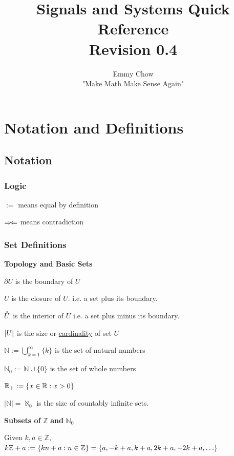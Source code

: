 \documentclass[11pt]{article}
\title{Signals and Systems Quick Reference \\ Revision 0.4}
\author{Emmy Chow \\ "Make Math Make Sense Again"}
\date{}
\begin{document}
  \maketitle
  \tableofcontents

  \pagebreak

  \section{Notation and Definitions}

  \subsection{Notation}

  \subsubsection{Logic}

  \(:= \) means equal by definition

  \(\Rightarrow\!\Leftarrow\) means contradiction
  \subsubsection{Set Definitions}

  \textbf{Topology and Basic Sets}

  \(\partial U\) is the boundary of \(U\)

  \(\overbar{U}\) is the closure of \(U\). i.e. a set plus its boundary.

  \(\mathring{U}\) is the interior of \(U\) i.e. a set plus minus its boundary.

  \(\left|U\right|\) is the size or \href{https://brilliant.org/wiki/cardinality/}{cardinality} of set \(U\)

  \(\mathbb{N} := \displaystyle \bigcup_{k = 1}^{\infty} \{k\}\) is the set of natural numbers

  \(\mathbb{N}_0 := \mathbb{N} \cup \{0\}\) is the set of whole numbers

  \(\mathbb{R}_{+} := {\left\{ x \in \mathbb{R} : x > 0 \right\}}\)

  \(|\mathbb{N}| = \aleph_0\) is the size of countably infinite sets.

  \textbf{Subsets of} \(\mathbb{Z}\) \textbf{and} \(\mathbb{N}_0\)

  Given \(k, a \in \mathbb{Z}\),
  \(k\mathbb{Z} + a:= \brc{kn + a : n \in \mathbb{Z}} = \brc{a, -k + a, k + a, 2k + a, -2k + a, \dots}\)
\end{document}
